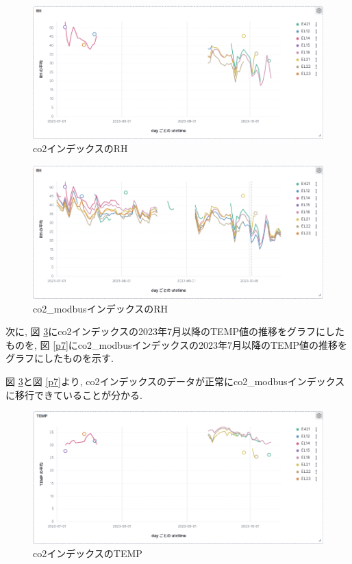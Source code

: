 \documentclass[a4j,12pt,]{jarticle}
\begin{document}
\begin{figure}[H]
  \begin{center}
    \includegraphics[width=160mm]{co2RH.png}
    \caption{co2インデックスのRH}
    \label{p4}
  \end{center}
\end{figure}

\begin{figure}[H]
  \begin{center}
    \includegraphics[width=160mm]{co2ModbusRH.png}
    \caption{co2\_modbusインデックスのRH}
    \label{p5}
  \end{center}
\end{figure}

次に, 図 \ref{p6}にco2インデックスの2023年7月以降のTEMP値の推移をグラフにしたものを, 図 \ref{p7}にco2\_modbusインデックスの2023年7月以降のTEMP値の推移をグラフにしたものを示す.

図 \ref{p6}と図 \ref{p7}より, co2インデックスのデータが正常にco2\_modbusインデックスに移行できていることが分かる.

\begin{figure}[H]
  \begin{center}
    \includegraphics[width=160mm]{co2Temp.png}
    \caption{co2インデックスのTEMP}
    \label{p6}
  \end{center}
\end{figure}
\end{document}
